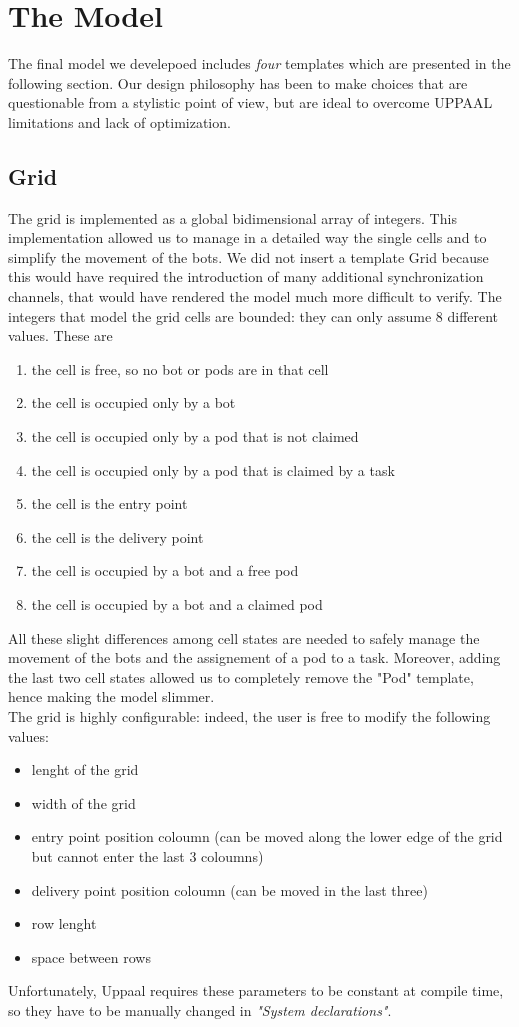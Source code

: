 \documentclass{article}
\begin{document}
	\tableofcontents
	\clearpage
	
	\section{The Model}
		The final model we develepoed includes \emph{four} templates which are presented in the following section. Our design philosophy has been to make choices that are questionable from a stylistic point of view, but are ideal to overcome UPPAAL limitations and lack of optimization.
		\subsection{Grid}
			The grid is implemented as a global bidimensional array of integers. This implementation allowed us to manage in a detailed way the single cells and to simplify the movement of the bots. We did not insert a template Grid because this would have required the introduction of many additional synchronization channels, that would have rendered the model much more difficult to verify.
			The integers that model the grid cells are bounded: they can only assume 8 different values. These are
			\begin{enumerate}[start=0, label={\arabic* :}]
				\item the cell is free, so no bot or pods are in that cell
				\item the cell is occupied only by a bot
				\item the cell is occupied only by a pod that is not claimed
				\item the cell is occupied only by a pod that is claimed by a task 
				\item the cell is the entry point 
				\item the cell is the delivery point
				\item the cell is occupied by a bot and a free pod
				\item the cell is occupied by a bot and a claimed pod
			\end{enumerate}
			All these slight differences among cell states are needed to safely manage the movement of the bots and the assignement of a pod to a task. Moreover, adding the last two cell states allowed us to completely remove the "Pod" template, hence making the model slimmer.\\
			The grid is highly configurable: indeed, the user is free to modify the following values:
			\begin{itemize}
				\item lenght of the grid
				\item width of the grid
				\item entry point position coloumn (can be moved along the lower edge of the grid but cannot enter the last 3 coloumns) 
				\item delivery point position coloumn (can be moved in the last three)
				\item row lenght
				\item space between rows
			\end{itemize}
			Unfortunately, Uppaal requires these parameters to be constant at compile time, so they have to be manually changed in \emph{"System declarations"}. 
			
\end{document}
